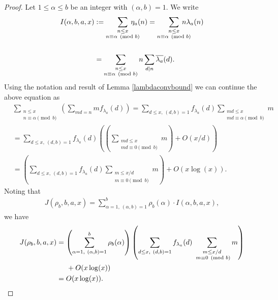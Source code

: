 \documentclass[12pt]{amsart}
\newcommand{\1}{\mathmybb{1}}
\begin{document}
\begin{proof}
Let $1\leq \alpha \leq b$ be an integer with $(\alpha,b)=1$. We write 
\begin{align*}
I(\alpha,b,a,x)&:=\sum_{\substack{n \leq x \\ n \equiv \alpha \pmod b}}\hspace{-0.5cm}\eta_{a}(n) = \sum_{\substack{n \leq x \\ n \equiv \alpha \pmod b}}\hspace{-0.5cm}n \lambda_{a}(n)\\\\
&= \sum_{\substack{n \leq x \\ n \equiv \alpha \pmod b}}n \sum_{d|n}\overline{\lambda_{a}}(d).
\end{align*}
Using the notation and result of Lemma \ref{lambdaconvbound} we can continue the above equation as
\begin{align*}
&\sum_{\substack{n \leq x \\ n \equiv \alpha \pmod b}}\left( \sum_{md = n}m f_{\lambda_{a}}(d)\right)= \sum_{d \leq x, \ (d,b) = 1}f_{\lambda_{a}}(d)\sum_{\substack{md \leq x \\ md \equiv \alpha \pmod b}} m\\
&= \sum_{d \leq x, \ (d,b) = 1}f_{\lambda_{a}}(d)\left(\left(\sum_{\substack{md \leq x \\ md \equiv 0 \pmod b}} m\right) + O(x/d)\right)\\
&=\left(\sum_{d \leq x, \ (d,b) = 1}f_{\lambda_{a}}(d)\sum_{\substack{m \leq x/d \\ m \equiv 0 \pmod b}} m \right) + O(x\log(x)).
\end{align*}
Noting that
\begin{align*}
J(\rho_{b},b,a,x) = \sum_{\alpha = 1, \ (\alpha,b) = 1}^{b}\rho_{b}(\alpha)\cdot I(\alpha,b,a,x),
\end{align*}
we have
\begin{align*}
J(\rho_{b},b,a,x) &= \left(\sum_{\alpha = 1, \ (\alpha,b) = 1}^{b}\rho_{b}(\alpha)\right)\left(\sum_{d \leq x, \ (d,b) = 1}f_{\lambda_{a}}(d)\sum_{\substack{m \leq x/d \\ \ m \equiv 0 \pmod b}} m \right)\\
&\hspace{0.5cm}+ O(x\log(x))\\
&= O(x\log(x)).
\end{align*}
\par \vspace{-\baselineskip} \qedhere
\end{proof}
\end{document}
